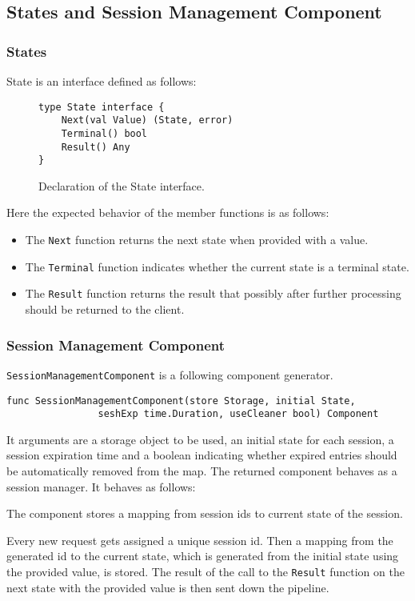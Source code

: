 \documentclass[12pt,a4paper]{article}
\begin{document}
\subsection{States and Session Management Component}
\subsubsection{States}
State is an interface defined as follows:
\begin{figure}[h]
\centering
\begin{lstlisting}
type State interface {
    Next(val Value) (State, error)
    Terminal() bool
    Result() Any
}
\end{lstlisting}
\caption[scale=1.0]{Declaration of the State interface.}
\label{fig:State}
\end{figure}

Here the expected behavior of the member functions is as follows:
\begin{itemize}
	\item The \texttt{Next} function returns the next state when provided with a value.
	\item The \texttt{Terminal} function indicates whether the current state is a terminal state.
	\item The \texttt{Result} function returns the result that possibly after further 
		  processing should be returned to the client.
\end{itemize}

\subsubsection{Session Management Component}
\texttt{SessionManagementComponent} is a following component generator.
\begin{lstlisting}
func SessionManagementComponent(store Storage, initial State, 
                seshExp time.Duration, useCleaner bool) Component
\end{lstlisting}

It arguments are a storage object to be used, an initial state for each session,
a session expiration time and a boolean indicating whether expired
entries should be automatically removed from the map.
The returned component behaves as a session manager. 
It behaves as follows:

The component stores a mapping from session ids to current state of the session.

Every new request gets assigned a unique session id. Then a mapping from the generated 
id to the current state, which is generated from the initial state using the provided value,
is stored. The result of the call to the \texttt{Result} function on the next state with the provided 
value is then sent down the pipeline.
\end{document}
